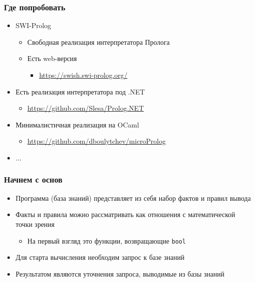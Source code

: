 \documentclass{../../slides-style}
\begin{document}
    \begin{frame}
        \frametitle{Где попробовать}
        \begin{itemize}
            \item SWI-Prolog
            \begin{itemize}
                \item Свободная реализация интерпретатора Пролога
                \item Есть web-версия
                \begin{itemize}
                    \item  \href{https://swish.swi-prolog.org/}{https://swish.swi-prolog.org/}
                \end{itemize}
            \end{itemize}
            \vspace{2mm}
            \item Есть реализация интерпретатора под .NET
            \begin{itemize}
                \item \href{https://github.com/Slesa/Prolog.NET}{https://github.com/Slesa/Prolog.NET}
            \end{itemize}
            \vspace{2mm}
            \item Минималистичная реализация на OCaml
            \begin{itemize}
                \item \href{https://github.com/dboulytchev/microProlog}{https://github.com/dboulytchev/microProlog}
            \end{itemize}
             \vspace{2mm}
            \item ...
        \end{itemize}
    \end{frame}

    \begin{frame}
        \frametitle{Начнем с основ}
        \begin{itemize}
            \item Программа (база знаний) представляет из себя набор фактов и правил вывода
            \vspace{2mm}
             \item Факты и правила можно рассматривать как отношения с математической точки зрения
             \begin{itemize}
                 \item На первый взгляд это функции, возвращающие \texttt{bool}
             \end{itemize}
            \vspace{2mm}
            \item Для старта вычисления необходим запрос к базе знаний
            \vspace{2mm}
            \item Результатом являются уточнения запроса, выводимые из базы знаний 
        \end{itemize}
    \end{frame}
\end{document}
